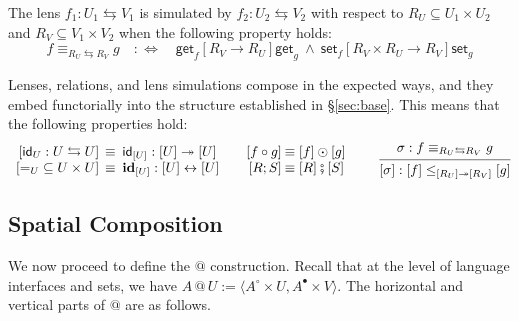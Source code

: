 \documentclass[acmsmall,screen,review,anonymous,nonacm]{acmart}
\newcommand{\kw}[1]{\ensuremath{ \mathsf{#1} }}
\newcommand{\ifr}[1]{\mathrel{[{#1}]}}
\newcommand{\que}{\circ}
\newcommand{\ans}{\bullet}
\newcommand{\lensarrow}{\leftrightarrows}
\newcommand{\lensle}{\equiv}
\newcommand{\idsc}{\mathbf{id}} %
\newcommand{\vcomp}{\fatsemi}
\begin{document}
\begin{definition}
The lens
$f_1 : U_1 \lensarrow V_1$
is simulated by
$f_2 : U_2 \lensarrow V_2$
with respect to
$R_U \subseteq U_1 \times U_2$ and 
$R_V \subseteq V_1 \times V_2$
when the following property holds: 
\[
  f \lensle_{R_U \lensarrow R_V} g
  \quad :\Leftrightarrow \quad
  \kw{get}_f \ifr{R_V \rightarrow R_U} \kw{get}_g
  \:\wedge\:
  \kw{set}_f \ifr{R_V \times R_U \rightarrow R_V} \kw{set}_g
\]
\end{definition}

Lenses, relations, and lens simulations
compose in the expected ways,
and they embed functorially into
the structure established in \S\ref{sec:base}.
This means that the following properties hold:
\[
\begin{array}{r@{\:}l@{\qquad}r@{\:}l}
  [\kw{id}_U : U \lensarrow U]
    &\:\equiv\: \kw{id}_{[U]} : [U] \twoheadrightarrow [U]
  &
  [f \circ g] &\equiv [f] \odot [g]
  \\
  {[{=}_U \subseteq U \times U]}
    &\:\equiv\: \idsc_{[U]} : [U] \leftrightarrow [U]
  &
  [R ; S] &\equiv [R] \vcomp [S]
\end{array}
\qquad
\begin{prooftree}
  \hypo{\sigma : f \equiv_{R_U \lensarrow R_V} g}
  \infer1{[\sigma] : [f] \le_{[R_U] \twoheadrightarrow [R_V]} [g]}
\end{prooftree}
\]


\subsection{Spatial Composition} \label{sec:scomp:tr} \label{sec:scomp:sc} %

We now proceed to define the $\mathbin@$ construction.
Recall that at the level of language interfaces and sets,
we have $A \mathbin@ U := \langle A^\que \times U, A^\ans \times V \rangle$.
The horizontal and vertical parts of $\mathbin@$ are as follows.
\end{document}
